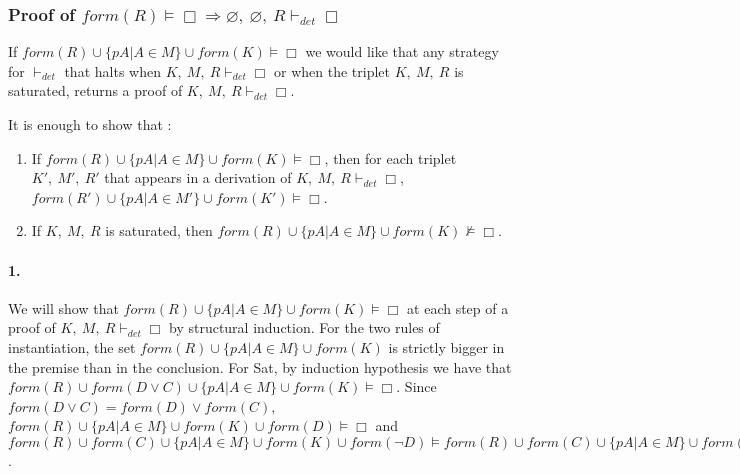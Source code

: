 \documentclass[a4paper,10pt]{article}
\newcommand{\dett}{\vdash_\mathit{det}}
\newcommand{\F}{\mathit{form}}
\begin{document}
\subsubsection*{Proof of $\F(R)\vDash\Box\Rightarrow\varnothing,\ \varnothing,\ R\dett\Box$}
If $\F(R)\cup\{pA|A\in M\}\cup\F(K)\vDash\Box$ we would like that any strategy for $\dett$
that halts when $K,\ M,\ R\dett\Box$ or when the triplet $K,\ M,\ R$ is saturated, returns
a proof of $K,\ M,\ R\dett\Box$.

It is enough to show that :
\begin{enumerate}
 \item If $\F(R)\cup\{pA|A\in M\}\cup\F(K)\vDash\Box$, then for each triplet $K',\ M',\ R'$
that appears in a derivation of $K,\ M,\ R\dett\Box$, $\F(R')\cup\{pA|A\in M'\}\cup\F(K')\vDash\Box$.
 \item If $K,\ M,\ R$ is saturated, then $\F(R)\cup\{pA|A\in M\}\cup\F(K)\nvDash\Box$.
\end{enumerate}
\paragraph{1.} 
We will show that $\F(R)\cup\{pA|A\in M\}\cup\F(K)\vDash\Box$ at each step of a proof of
$K,\ M,\ R\dett\Box$ by structural induction. For the two rules of instantiation, the set
$\F(R)\cup\{pA|A\in M\}\cup\F(K)$ is strictly bigger in the premise than in the conclusion.
For {\sc Sat}, by induction hypothesis we have that
$\F(R)\cup\F(D\vee C)\cup\{pA|A\in M\}\cup\F(K)\vDash\Box$. Since $\F(D\vee C)=\F(D)\vee\F(C)$,
$\F(R)\cup\{pA|A\in M\}\cup\F(K)\cup\F(D)\vDash\Box$ and
$\F(R)\cup\F(C)\cup\{pA|A\in M\}\cup\F(K)\cup\F(\neg D)\vDash
\F(R)\cup\F(C)\cup\{pA|A\in M\}\cup\F(K)\vDash\Box$.
\end{document}
